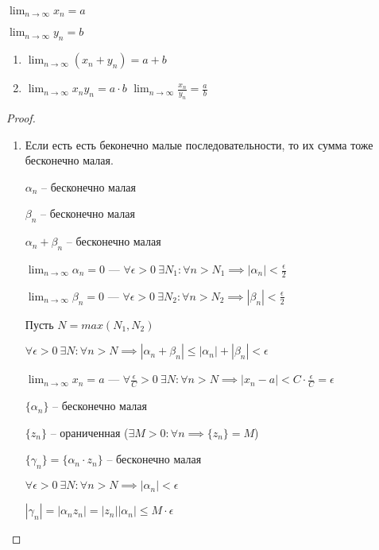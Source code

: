 \begin{statement}
    $\lim_{n \to \infty} x_n = a$

    $\lim_{n \to \infty} y_n = b$

    \begin{enumerate}
        \item $\lim_{n \to \infty} (x_n + y_n) = a + b$
        \item $\lim_{n \to \infty} x_n y_n = a \cdot b$
        \itme $\lim_{n \to \infty} \frac{x_n}{y_n} = \frac{a}{b}$

    \end{enumerate}
\end{statement}

\begin{proof}~
    \begin{enumerate}
    \item 
        Если есть есть беконечно малые последовательности, то их сумма тоже бесконечно малая.
        
        $\alpha_n$ -- бесконечно малая
        
        $\beta_n$ -- бесконечно малая

        $\alpha_n + \beta_n$ -- бесконечно малая

        $\lim_{n \to \infty} \alpha_n = 0$ --- $\forall \epsilon > 0 \ \exists N_1 : \forall n > N_1 \implies |\alpha_n| < \frac{\epsilon}{2}$

        $\lim_{n \to \infty} \beta_n = 0$ --- $\forall \epsilon > 0 \ \exists N_2 : \forall n > N_2 \implies |\beta_n|< \frac{\epsilon}{2}$

        Пусть $N = max(N_1, N_2)$

        $\forall \epsilon > 0 \ \exists N : \forall n > N \implies |\alpha_n + \beta_n| \leq |\alpha_n| + |\beta_n| < \epsilon$
    
        $\lim_{n \to \infty} x_n = a$ --- $\forall \frac{\epsilon}{C} > 0 \ \exists N : \forall n > N \implies |x_n - a| < C \cdot \frac{\epsilon}{C} = \epsilon$

        $\{\alpha_n\}$ -- бесконечно малая

        $\{z_n\}$ -- ораниченная
        ($\exists M > 0 : \forall n \implies \{z_n\} = M$)

        $\{\gamma_n\} = \{\alpha_n \cdot z_n\}$ -- бесконечно малая

        $\forall \epsilon > 0 \ \exists N : \forall n > N \implies |\alpha_n| < \epsilon$

        $|\gamma_n| = |\alpha_n z_n| = |z_n||\alpha_n| \leq M \cdot \epsilon$


\end{enumerate}
\end{proof}
